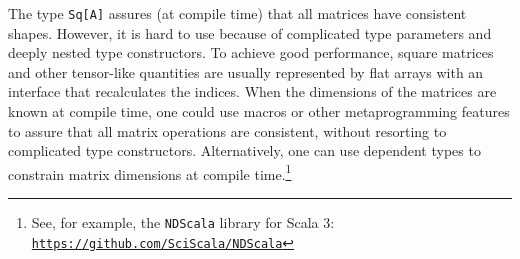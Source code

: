 The type \lstinline!Sq[A]! assures (at compile time) that all matrices
have consistent shapes. However, it is hard to use because of complicated
type parameters and deeply nested type constructors. To achieve good
performance, square matrices and other tensor-like quantities are
usually represented by flat arrays with an interface that recalculates
the indices. When the dimensions of the matrices are known at compile
time, one could use macros or other metaprogramming features to assure
that all matrix operations are consistent, without resorting to complicated
type constructors. Alternatively, one can use dependent types to constrain
matrix dimensions at compile time.\footnote{See, for example, the \texttt{NDScala} library for Scala 3: \texttt{\href{https://github.com/SciScala/NDScala}{https://github.com/SciScala/NDScala}}}
\begin{comment}
this is chapter 9 of the functional programming tutorial traversable
functors to motivate the interrupted introduction of these factors
into practice I always remember the example that you have a list of
some data items and you want to process it by using a function like
this where you have a future as a as a result of this function and
the usual way of doing this in Scala is to use a function called future
dot sequence and I have seen this I have shown this in a previous
tutorial and the idea is that you want to process each element of
this list with this function and you have to wait until the entire
list is done so we have many separate computations for each element
of the list encapsulated by the future for each one of them you want
to wait until the entire list is done and basically this is the type
signature that you want in order to implement this computation you
have a list of a you have a function from a to future B and you want
to get a list of B as a result and you can get it in the future so
you have a future of lists of it as a result and that is the type
signature that the function future that sequence will allow you to
have with some work but in order to understand what this kind of computation
does we want to generalize from the future to an arbitrary type constructor
F and we want to understand what properties these type constructors
must answer so the list we have L and instead the future we have F
and the type signature of the function is like this so this function
is called Traverse I believe there\textsf{'}s also a future of traders with
a type signature like this that works on sequences we want to generalize
to some type constructors F and L and that\textsf{'}s what we will be able

\end{comment}

